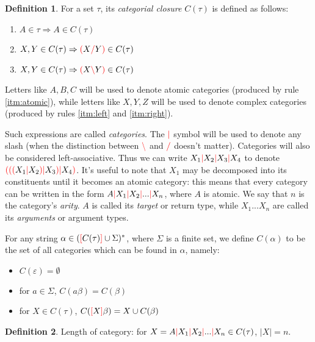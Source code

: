 \documentclass[12pt]{extarticle}
\theoremstyle{definition} \newtheorem{defn}{Definition}
\theoremstyle{definition} \newtheorem{prop}{Proposition}
\newcommand{\lc}{\textcolor{red}{\backslash}}
\newcommand{\rc}{\textcolor{red}{/}}
\newcommand{\mc}{\textcolor{red}{|}}
\newcommand{\lb}{\textcolor{red}{[}}
\newcommand{\rb}{\textcolor{red}{]}}
\newcommand{\lp}{\textcolor{red}{(}}
\newcommand{\rp}{\textcolor{red}{)}}
\begin{document}
\begin{defn}
    For a set $\tau$, its \emph{categorial closure} $C(\tau)$ is defined as follows:
    \begin{enumerate}
        \item \label{itm:atomic} $A \in \tau \Rightarrow A \in C(\tau)$
        \item \label{itm:right}  $X, Y \in C(\tau) \Rightarrow \lp X \rc Y \rp \in C(\tau)$
        \item \label{itm:left}   $X, Y \in C(\tau) \Rightarrow \lp X \lc Y \rp \in C(\tau)$
    \end{enumerate}

    Letters like $A, B, C$ will be used to denote atomic categories (produced
    by rule \ref{itm:atomic}), while letters like $X, Y, Z$ will be used to
    denote complex categories (produced by rules \ref{itm:left} and \ref{itm:right}).

    Such expressions are called \emph{categories}. The $\mc$ symbol will be
    used to denote any slash (when the distinction between $\lc$ and $\rc$
    doesn't matter). Categories will also be considered left-associative.
    Thus we can write $X_1 \mc X_2 \mc X_3 \mc X_4$ to denote
    $\lp \lp \lp X_1 \mc X_2 \rp \mc X_3 \rp \mc X_4 \rp$. It's useful to note that $X_1$ may
    be decomposed into its constituents until it becomes an atomic category:
    this means that every category can be written in the form
    $A \mc X_1 \mc X_2 \mc ... \mc X_n$, where $A$ is atomic. We say that
    $n$ is the category's \emph{arity}. $A$ is called its \emph{target} or
    return type, while
    $X_1 ... X_n$ are called its \emph{arguments} or argument types.

    For any string $\alpha \in (\lb C(\tau) \rb \cup \Sigma)^*$, where $\Sigma$ is a
    finite set, we define $C(\alpha)$ to be the set of all categories which
    can be found in $\alpha$, namely:
    \begin{itemize}
        \item $C(\varepsilon) = \emptyset$
        \item for $a \in \Sigma$, $C(a\beta) = C(\beta)$
        \item for $X \in C(\tau)$, $C(\lb X \rb \beta) = X \cup C(\beta)$
    \end{itemize}
\end{defn}

\begin{defn}
    Length of category: for $X = A \mc X_1 \mc X_2 \mc ... \mc X_n \in C(\tau)$,
    $|X| = n$.
\end{defn}
\end{document}
